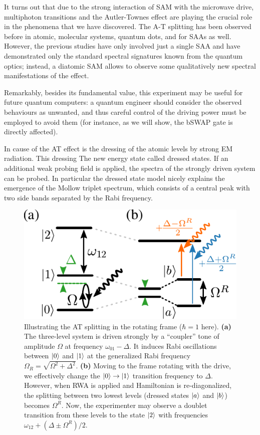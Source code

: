 \documentclass[%
 aip,
 amsmath,amssymb,
 reprint,%
]{revtex4-1}
\begin{document}
It turns out that due to the strong interaction of SAM with the microwave drive, multiphoton transitions and the Autler-Townes effect are playing the crucial role in the phenomena that we have discovered. The A-T splitting has been observed before in atomic\cite{picque1976direct}, molecular systems\cite{tamarat1995pump}, quantum dots\cite{xu2007coherent}, and for SAAs as well\cite{baur2009measurement, sillanpaa2009autler, novikov2013autler, suri2013observation, peng2018vacuum}. However, the previous studies have  only involved just a single SAA and have demonstrated only the standard spectral signatures known from the quantum optics; instead, a diatomic SAM allows to observe some qualitatively new spectral manifestations of the effect. 

Remarkably, besides its fundamental value, this experiment may be useful for future quantum computers: a quantum engineer should consider the observed behaviours as unwanted, and thus careful control of the driving power must be employed to avoid them (for instance, as we will show, the bSWAP gate\cite{poletto2012entanglement} is directly affected).

In  cause of the AT effect is the dressing of the atomic levels by strong EM radiation. This dressing The new energy state called dressed states. If an additional weak probing field is applied, the spectra of the strongly driven system can be probed. In particular the dressed state model nicely explains the emergence of the Mollow triplet\cite{newstein1968spontaneous} spectrum, which consists of a central peak with two side bands separated by the Rabi frequency. 

\begin{figure}
	\includegraphics[width=\linewidth]{intro_scheme}
	\caption{Illustrating the AT splitting in the rotating frame ($\hbar=1$ here). \textbf{(a)} The three-level system is driven strongly by a ``coupler'' tone of amplitude $\Omega$ at frequency $\omega_{01}-\Delta$. It induces Rabi oscillations between $\ket{0}$ and $\ket{1}$ at the generalized Rabi frequency $\Omega_R = \sqrt{\Omega^2 + \Delta^2}$. \textbf{(b)} Moving to the frame rotating with the drive, we effectively change the $\ket{0}\rightarrow \ket{1}$ transition frequency to $\Delta$. However, when RWA is applied and Hamiltonian is re-diagonalized, the splitting between two lowest levels (dressed states $\ket{a}$ and $\ket{b}$) becomes $\Omega^R$. Now, the experimenter may observe a doublet transition from these levels to the state $\ket{2}$ with frequencies $\omega_{12}+(\Delta \pm \Omega^R)/2$.} 
\end{figure}
\end{document}
